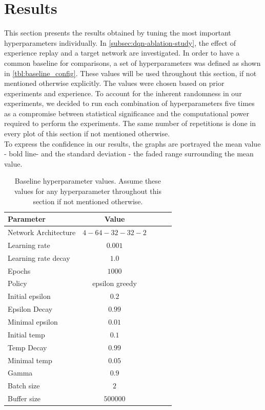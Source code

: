 \documentclass{article}
\begin{document}
\section{Results}
\label{sec:results}
This section presents the results obtained by tuning the most important hyperparameters individually. 
In \autoref{subsec:dqn-ablation-study}, the effect of experience replay and a target network are investigated.
In order to have a common baseline for comparisons, a set of hyperparameters was defined as shown in \autoref{tbl:baseline_config}. 
These values will be used throughout this section, if not mentioned otherwise explicitly.
The values were chosen based on prior experiments and experience.
To account for the inherent randomness in our experiments,
we decided to run each combination of hyperparameters five times as a compromise between statistical significance and the computational power required to perform the experiments. The same number of repetitions is done in every plot of this section if not mentioned otherwise.\\
To express the confidence in our results, the graphs are portrayed the mean value - bold line- and the standard deviation - the faded range surrounding the mean value. 

\begin{table}[ht]
   \caption{Baseline hyperparameter values. Assume these values for any hyperparameter throughout this section if not mentioned otherwise.}
   \label{tbl:baseline_config}
   \vskip 0.15in
   \begin{center}
   \begin{small}
   \begin{sc}
   \begin{tabular}{lcccr}
   \toprule
   Parameter & Value \\
   \midrule
   Network Architecture    & $4-64-32-32-2$ \\
   Learning rate           & $0.001$ \\
   Learning rate decay     & $1.0$   \\
   Epochs                  & $1000$ \\
   Policy                  & epsilon greedy \\
   Initial epsilon         & $0.2$ \\
   Epsilon Decay           & $0.99$ \\
   Minimal epsilon         & $0.01$ \\
   Initial temp            & $0.1$ \\
   Temp Decay              & $0.99$ \\
   Minimal temp            & $0.05$ \\
   Gamma                   & $0.9$ \\
   Batch size              & $2$ \\
   Buffer size             & $500000$ \\
   \bottomrule
   \end{tabular}
   \end{sc}
   \end{small}
   \end{center}
   \vskip -0.1in
\end{table}
\end{document}

